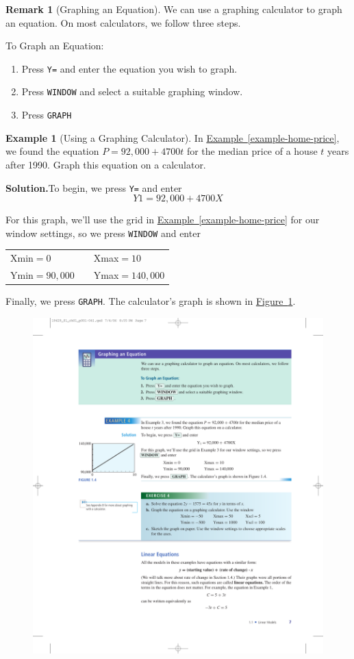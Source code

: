 \documentclass[10pt,]{book}
\theoremstyle{plain}
\theoremstyle{definition}
\newtheorem{remark}[theorem]{Remark}
\theoremstyle{definition}
\newtheorem{example}[theorem]{Example}
\theoremstyle{definition}
\theoremstyle{definition}
\numberwithin{equation}{part}
\begin{document}
\begin{remark}[Graphing an Equation]\label{remark-1}
We can use a graphing calculator to graph an equation. On most calculators, we follow three steps.%
\par
To Graph an Equation:%
\leavevmode%
\begin{enumerate}
\item\hypertarget{li-45}{}Press \lstinline?Y=? and enter the equation you wish to graph.%
\item\hypertarget{li-46}{}Press \lstinline?WINDOW? and select a suitable graphing window.%
\item\hypertarget{li-47}{}Press \lstinline?GRAPH?%
\end{enumerate}
\end{remark}
\begin{example}[Using a Graphing Calculator]\label{graphing-calculator}
In \hyperref[example-home-price]{Example~\ref{example-home-price}}, we found the equation \(P = 92,000 + 4700t\) for the median price of a house \(t\) years after 1990. Graph this equation on a calculator.%
\par\medskip\noindent%
\textbf{Solution.}\quad To begin, we press \lstinline?Y=? and enter%
\begin{equation*}
Y1 = 92,000 + 4700X
\end{equation*}
%
\par
For this graph, we’ll use the grid in \hyperref[example-home-price]{Example~\ref{example-home-price}} for our window settings, so we press \lstinline?WINDOW? and enter%
\begin{table}
\centering
\begin{tabular}{lll}
Xmin\(=0\)&&Xmax\(=10\)\tabularnewline[0pt]
Ymin\(=90,000\)&&Ymax\(=140,000\)
\end{tabular}
\end{table}
Finally, we press \lstinline?GRAPH?. The calculator's graph is shown in \hyperref[fig-GC-house-price]{Figure~\ref{fig-GC-house-price}}. \begin{figure}
\centering
\includegraphics[width=0.5\linewidth]{images/fig-GC-house-price}
\caption{\label{fig-GC-house-price}}
\end{figure}
%
\end{example}
\end{document}
